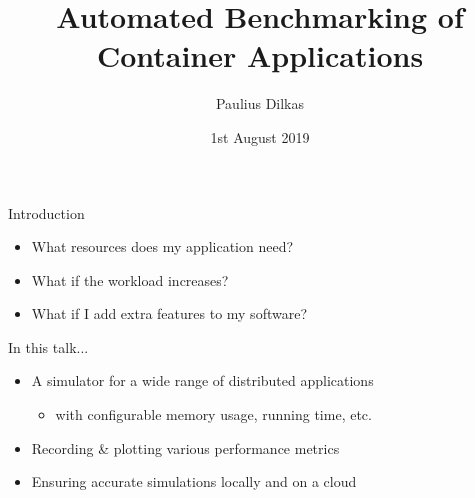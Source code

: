 \documentclass{beamer}
\author{Paulius Dilkas}
\title[Automated Benchmarking]{Automated Benchmarking of Container Applications}
\date{1st August 2019}
\begin{document}
\maketitle

\begin{frame}{Introduction}
  \begin{itemize}
  \item What resources does my application need?
  \item What if the workload increases?
  \item What if I add extra features to my software?
  \end{itemize}
  \begin{block}{In this talk...}
    \begin{itemize}
    \item A simulator for a wide range of distributed applications
      \begin{itemize}
      \item with configurable memory usage, running time, etc.
      \end{itemize}
    \item Recording \& plotting various performance metrics
    \item Ensuring accurate simulations locally and on a cloud
    \end{itemize}
  \end{block}
\end{frame}
\end{document}
